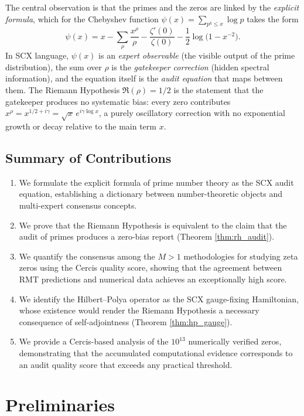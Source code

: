 \documentclass[12pt,a4paper]{article}
\theoremstyle{remark}
\begin{document}
The central observation is that the primes and the zeros are linked by the
\emph{explicit formula}, which for the Chebyshev function
$\psi(x) = \sum_{p^{k} \leq x} \log p$ takes the form
\[
\psi(x) = x - \sum_{\rho} \frac{x^{\rho}}{\rho} - \frac{\zeta'(0)}{\zeta(0)}
- \frac12 \log\!\bigl(1 - x^{-2}\bigr).
\]
In SCX language, $\psi(x)$ is an \emph{expert observable} (the visible
output of the prime distribution), the sum over $\rho$ is the
\emph{gatekeeper correction} (hidden spectral information), and the
equation itself is the \emph{audit equation} that maps between them.
The Riemann Hypothesis $\Re(\rho) = 1/2$ is the statement that the
gatekeeper produces no systematic bias: every zero contributes
$x^{\rho} = x^{1/2 + i\gamma} = \sqrt{x}\, e^{i\gamma \log x}$, a purely
oscillatory correction with no exponential growth or decay relative to the
main term $x$.
\subsection{Summary of Contributions}
\label{sec:contributions}
\begin{enumerate}
  \item We formulate the explicit formula of prime number theory as the
        SCX audit equation, establishing a dictionary between number-theoretic
        objects and multi-expert consensus concepts.
  \item We prove that the Riemann Hypothesis is equivalent to the claim that
        the audit of primes produces a zero-bias report (Theorem \ref{thm:rh_audit}).
  \item We quantify the consensus among the $M > 1$ methodologies for
        studying zeta zeros using the Cercis quality score, showing that
        the agreement between RMT predictions and numerical data achieves
        an exceptionally high score.
  \item We identify the Hilbert--Polya operator as the SCX gauge-fixing
        Hamiltonian, whose existence would render the Riemann Hypothesis
        a necessary consequence of self-adjointness (Theorem
        \ref{thm:hp_gauge}).
  \item We provide a Cercis-based analysis of the $10^{13}$ numerically
        verified zeros, demonstrating that the accumulated computational
        evidence corresponds to an audit quality score that exceeds any
        practical threshold.
\end{enumerate}
\section{Preliminaries}
\label{sec:preliminaries}
\end{document}
